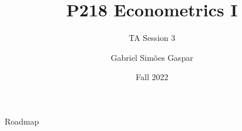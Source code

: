 \documentclass[10pt, xcolor=dvipsnames,compress]{beamer}
\title{P218 Econometrics I}
\subtitle{TA Session 3}
\author{Gabriel Simões Gaspar}
\institute{London Business School}
\date{Fall 2022}
\begin{document}
\maketitle

\begin{frame}{Roadmap}
    \tableofcontents
\end{frame}











\end{document}
